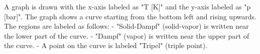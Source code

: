 A graph is drawn with the x-axis labeled as "T [K]" and the y-axis labeled as "p [bar]". The graph shows a curve starting from the bottom left and rising upwards. The regions are labeled as follows:  
- "Solid-Dampf" (solid-vapor) is written near the lower part of the curve.  
- "Dampf" (vapor) is written near the upper part of the curve.  
- A point on the curve is labeled "Tripel" (triple point).